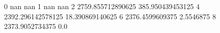 0 nan nan
1 nan nan
2 2759.855712890625 385.950439453125
4 2392.296142578125 18.390869140625
6 2376.4599609375 2.5546875
8 2373.9052734375 0.0
